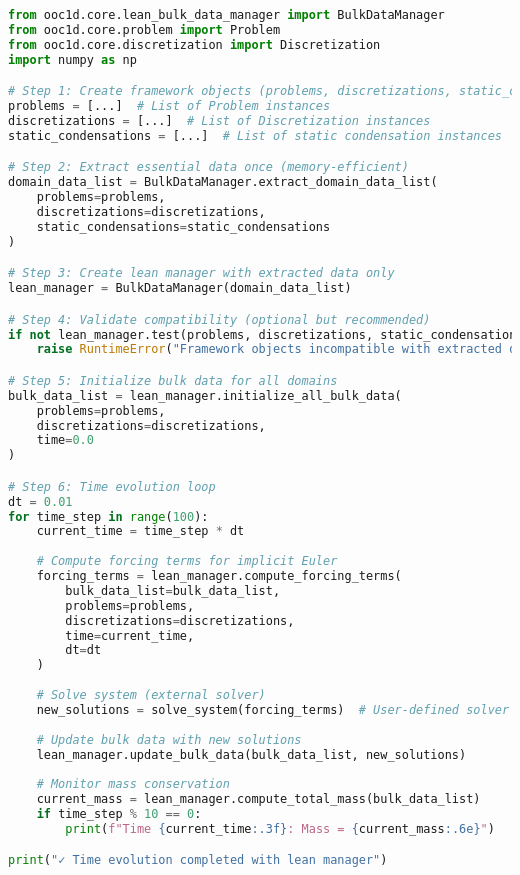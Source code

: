\begin{lstlisting}[language=Python, caption=Complete Lean Manager Workflow]
from ooc1d.core.lean_bulk_data_manager import BulkDataManager
from ooc1d.core.problem import Problem
from ooc1d.core.discretization import Discretization
import numpy as np

# Step 1: Create framework objects (problems, discretizations, static_condensations)
problems = [...]  # List of Problem instances
discretizations = [...]  # List of Discretization instances  
static_condensations = [...]  # List of static condensation instances

# Step 2: Extract essential data once (memory-efficient)
domain_data_list = BulkDataManager.extract_domain_data_list(
    problems=problems,
    discretizations=discretizations,
    static_condensations=static_condensations
)

# Step 3: Create lean manager with extracted data only
lean_manager = BulkDataManager(domain_data_list)

# Step 4: Validate compatibility (optional but recommended)
if not lean_manager.test(problems, discretizations, static_condensations):
    raise RuntimeError("Framework objects incompatible with extracted data")

# Step 5: Initialize bulk data for all domains
bulk_data_list = lean_manager.initialize_all_bulk_data(
    problems=problems,
    discretizations=discretizations,
    time=0.0
)

# Step 6: Time evolution loop
dt = 0.01
for time_step in range(100):
    current_time = time_step * dt
    
    # Compute forcing terms for implicit Euler
    forcing_terms = lean_manager.compute_forcing_terms(
        bulk_data_list=bulk_data_list,
        problems=problems,
        discretizations=discretizations,
        time=current_time,
        dt=dt
    )
    
    # Solve system (external solver)
    new_solutions = solve_system(forcing_terms)  # User-defined solver
    
    # Update bulk data with new solutions
    lean_manager.update_bulk_data(bulk_data_list, new_solutions)
    
    # Monitor mass conservation
    current_mass = lean_manager.compute_total_mass(bulk_data_list)
    if time_step % 10 == 0:
        print(f"Time {current_time:.3f}: Mass = {current_mass:.6e}")

print("✓ Time evolution completed with lean manager")
\end{lstlisting}

